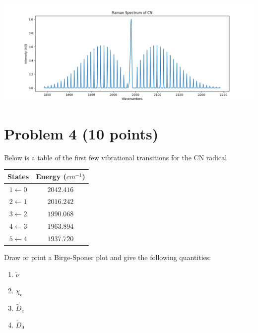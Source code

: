 \documentclass[10pt, letterpaper]{memoir}
\begin{document}
	\noindent
	\includegraphics[trim= 60 0 60 0, clip=true, width=\linewidth]{CN_Raman}
	 
	\newpage
	\section*{Problem 4 (10 points)}
	Below is a table of the first few vibrational transitions for the CN radical
	
	\begin{tabular}{c|c}
		States & Energy ($cm^{-1}$) \\ \midrule
		$1\leftarrow0$ & $2042.416$ \\
		$2\leftarrow1$ & $2016.242$ \\
		$3\leftarrow2$ & $1990.068$ \\
		$4\leftarrow3$ & $1963.894$ \\
		$5\leftarrow4$ & $1937.720$ \\
	\end{tabular}

	\noindent
	Draw or print a Birge-Sponer plot and give the following quantities:
	\begin{enumerate}
		\item $\tilde{\nu}$
		\item $\chi_e$
		\item $\tilde{D}_e$
		\item $\tilde{D}_0$
	\end{enumerate}
	
\end{document}
